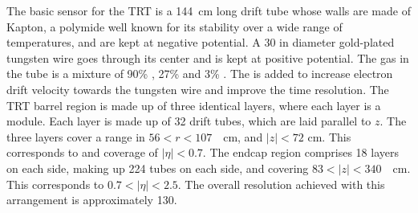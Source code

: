 \par The basic sensor for the TRT is a \SI{144}{\cm} long drift tube whose walls are 
made of Kapton, a polymide well known for its stability over a wide range of temperatures, and 
are kept at negative potential. A \SI{30}{\micron} in diameter gold-plated tungsten wire goes through its 
center and is kept at positive potential. The gas in the tube is a mixture 
of 90\%  , 27\%  and 3\% . The  is added to increase electron drift velocity 
towards the tungsten wire and improve the time resolution. 
The TRT barrel region is made up of three identical layers, where each layer is a module. Each layer 
is made up of 32 drift tubes, which are laid parallel to $z$.
The three layers cover a range in $56<r<107$~\SI{}{\cm}, and $|z|< 72$ cm. This corresponds to 
and coverage of $|\eta|<0.7$. The endcap region comprises 18 layers on each side, making up 224 tubes 
on each side, and covering $83<|z|<340$~\SI{}{\cm}. This corresponds to $0.7<|\eta|<2.5$.
The overall resolution achieved with this arrangement is approximately \SI{130}{\micron}.  

%
